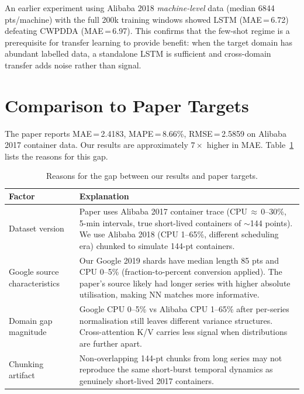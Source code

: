 \documentclass[12pt,a4paper]{article}
\begin{document}
An earlier experiment using Alibaba 2018 \emph{machine-level} data (median 6844 pts/machine)
with the full 200k training windows showed LSTM (MAE\,=\,6.72) defeating CWPDDA
(MAE\,=\,6.97).  This confirms that the few-shot regime is a prerequisite for
transfer learning to provide benefit: when the target domain has abundant labelled
data, a standalone LSTM is sufficient and cross-domain transfer adds noise rather
than signal.

\section{Comparison to Paper Targets}

The paper reports MAE\,=\,2.4183, MAPE\,=\,8.66\%, RMSE\,=\,2.5859 on Alibaba 2017
container data.  Our results are approximately $7\times$ higher in MAE.
Table~\ref{tab:gap} lists the reasons for this gap.

\begin{table}[H]
\centering
\caption{Reasons for the gap between our results and paper targets.}
\label{tab:gap}
\begin{tabularx}{\textwidth}{@{}lX@{}}
\toprule
\textbf{Factor} & \textbf{Explanation} \\
\midrule
Dataset version &
    Paper uses Alibaba 2017 container trace (CPU\,$\approx$\,0–30\%,
    5-min intervals, true short-lived containers of $\sim$144 points).
    We use Alibaba 2018 (CPU 1–65\%, different scheduling era)
    chunked to simulate 144-pt containers. \\
\addlinespace
Google source characteristics &
    Our Google 2019 shards have median length 85 pts and CPU 0–5\%
    (fraction-to-percent conversion applied).  The paper's source likely
    had longer series with higher absolute utilisation, making NN matches
    more informative. \\
\addlinespace
Domain gap magnitude &
    Google CPU 0–5\% vs Alibaba CPU 1–65\% after per-series normalisation
    still leaves different variance structures.  Cross-attention K/V
    carries less signal when distributions are further apart. \\
\addlinespace
Chunking artifact &
    Non-overlapping 144-pt chunks from long series may not reproduce the
    same short-burst temporal dynamics as genuinely short-lived 2017
    containers. \\
\bottomrule
\end{tabularx}
\end{table}
\end{document}
